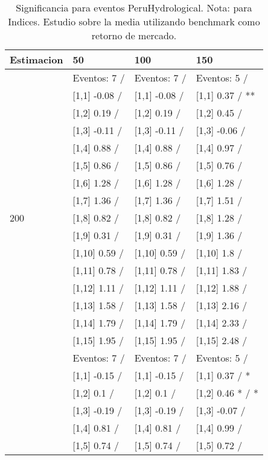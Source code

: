 \begin{table}

\caption{Significancia para eventos PeruHydrological. Nota: para Indices. Estudio sobre la media utilizando benchmark como retorno de mercado.}
\centering
\begin{tabular}[t]{llll}
\toprule
Estimacion & 50 & 100 & 150\\
\midrule
 & Eventos:  7 / & Eventos:  7 / & Eventos:  5 /\\
 & {}[1,1] -0.08  / & {}[1,1] -0.08  / & {}[1,1] 0.37  / **\\
 & {}[1,2] 0.19  / & {}[1,2] 0.19  / & {}[1,2] 0.45  /\\
 & {}[1,3] -0.11  / & {}[1,3] -0.11  / & {}[1,3] -0.06  /\\
 & {}[1,4] 0.88  / & {}[1,4] 0.88  / & {}[1,4] 0.97  /\\
\addlinespace
 & {}[1,5] 0.86  / & {}[1,5] 0.86  / & {}[1,5] 0.76  /\\
 & {}[1,6] 1.28  / & {}[1,6] 1.28  / & {}[1,6] 1.28  /\\
 & {}[1,7] 1.36  / & {}[1,7] 1.36  / & {}[1,7] 1.51  /\\
200 & {}[1,8] 0.82  / & {}[1,8] 0.82  / & {}[1,8] 1.28  /\\
 & {}[1,9] 0.31  / & {}[1,9] 0.31  / & {}[1,9] 1.36  /\\
\addlinespace
 & {}[1,10] 0.59  / & {}[1,10] 0.59  / & {}[1,10] 1.8  /\\
 & {}[1,11] 0.78  / & {}[1,11] 0.78  / & {}[1,11] 1.83  /\\
 & {}[1,12] 1.11  / & {}[1,12] 1.11  / & {}[1,12] 1.88  /\\
 & {}[1,13] 1.58  / & {}[1,13] 1.58  / & {}[1,13] 2.16  /\\
 & {}[1,14] 1.79  / & {}[1,14] 1.79  / & {}[1,14] 2.33  /\\
\addlinespace
 & {}[1,15] 1.95  / & {}[1,15] 1.95  / & {}[1,15] 2.48  /\\
 & Eventos:  7 / & Eventos:  7 / & Eventos:  5 /\\
 & {}[1,1] -0.15  / & {}[1,1] -0.15  / & {}[1,1] 0.37  / *\\
 & {}[1,2] 0.1  / & {}[1,2] 0.1  / & {}[1,2] 0.46 * / *\\
 & {}[1,3] -0.19  / & {}[1,3] -0.19  / & {}[1,3] -0.07  /\\
\addlinespace
 & {}[1,4] 0.81  / & {}[1,4] 0.81  / & {}[1,4] 0.99  /\\
 & {}[1,5] 0.74  / & {}[1,5] 0.74  / & {}[1,5] 0.72  /\\

\end{tabular}
\end{table}
